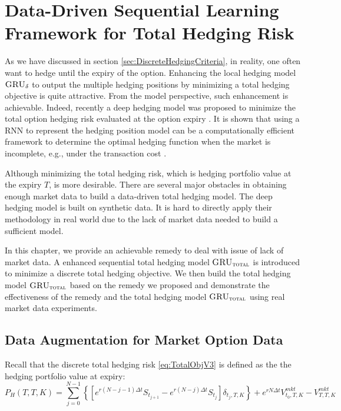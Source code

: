 \documentclass[letterpaper,12pt,titlepage,oneside,final]{book}
\numberwithin{equation}{section}
\theoremstyle{definition}
\newcommand{\model}{\textsc{GRU}_\delta}
\newcommand{\modelT}{\textsc{GRU}_{\textsc{total}}}
\newcommand{\Vmkt}{V^{mkt}}
\newcommand{\Smkt}{S}
\begin{document}
\chapter{Data-Driven Sequential Learning Framework for Total Hedging Risk}
\label{sec:RNNTotal}
As we have discussed in section \ref{sec:DiscreteHedgingCriteria}, in reality, one often want to hedge until the expiry of the option. Enhancing the local hedging model $\model$ to output the multiple hedging positions by minimizing a total hedging objective is quite attractive. From the model perspective, such enhancement is achievable. Indeed, recently a deep hedging model was proposed to minimize the total option hedging risk evaluated at the option expiry  \citep{buehler2019deep}. It is shown  that using a RNN to represent the hedging position model can be a computationally efficient framework to determine the optimal hedging function when the market is incomplete, e.g., under the transaction cost \citep{buehler2019deep}.

Although minimizing the total hedging risk, which is hedging portfolio value at the expiry $T$, is more desirable. There are several major obstacles in obtaining enough market data to build a data-driven total hedging model. The deep hedging model \citep{buehler2019deep} is built on synthetic data. It is hard to directly apply their methodology in real world due to the lack of market data needed to build a sufficient model. 

In this chapter, we  provide an achievable remedy  to deal with issue of lack of market data.  A enhanced  sequential total hedging model $\modelT$ is introduced to minimize a discrete total hedging objective. We then build the total hedging model $\modelT$ based on the remedy we proposed and demonstrate the effectiveness of the remedy and the  total hedging model $\modelT$ using real market data experiments.  




\section{Data Augmentation for Market Option Data}
\label{sec:DataAugmentation}
Recall that the discrete total hedging risk \eqref{eq:TotalObjV3} is defined as the the hedging portfolio value at expiry:
\[
    P_H(T,T,K)=\sum_{j=0}^{N-1}\left\{ \left[e^{r (N-j-1) \Delta t} \Smkt_{t_{j+1}}-e^{r (N-j) \Delta t}\Smkt_{t_{j}}\right] \delta_{t_j,T,K} \right\}+e^{r N \Delta t} \Vmkt_{t_0,T,K}-\Vmkt_{T,T,K}
\]
\end{document}
